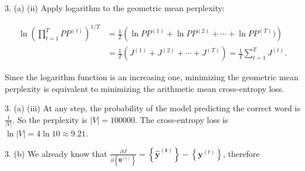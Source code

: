 \documentclass[twoside]{article}
\begin{document}
3. (a) (ii) Apply logarithm to the geometric mean perplexity:

\begin{align*}
	\ln\left(\prod_{t=1}^{T}PP^{(t)}\right)^{1/T} &= \frac{1}{T}\left(\ln PP^{(1)} + \ln PP^{(2)} + \cdots + \ln PP^{(T)})\right)\\
	&= \frac{1}{T}\left(J^{(1)} + J^{(2)} + \cdots + J^{(T)}\right) = \frac{1}{T}\sum_{t=1}^{T}J^{(t)}.
\end{align*}

Since the logarithm function is an increasing one, minimizing the geometric mean perplexity is equivalent to minimizing the arithmetic mean cross-entropy loss.

3. (a) (iii) At any step, the probability of the model predicting the correct word is $\frac{1}{\left|V\right|}$. So the perplexity is $\left|V\right|=100000$. The cross-entropy loss is $\ln\left|V\right| =4\ln 10\approx 9.21$.

3. (b) We already know that $\frac{\partial J}{\partial\left\{\bm{\theta}^{(t)}\right\}} = \left\{\bm{\hat{y}^{(t)}}\right\}-\left\{\bm{y}^{(t)}\right\}$, therefore
	
\end{document}
